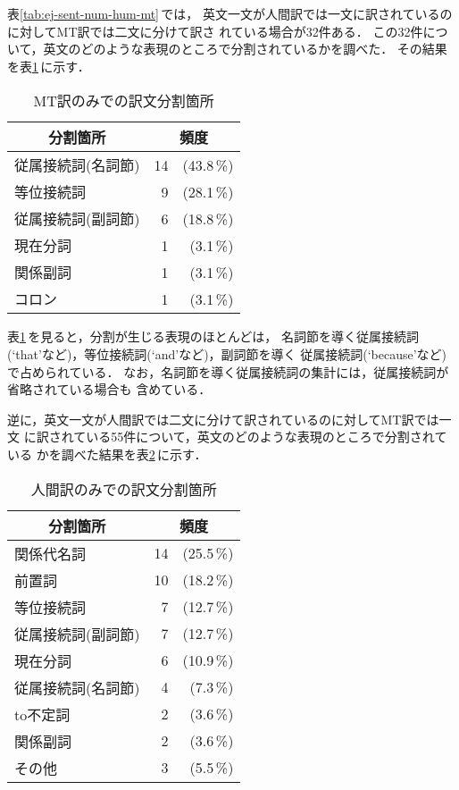 表\ref{tab:ej-sent-num-hum-mt}\,では，
英文一文が人間訳では一文に訳されているのに対してMT訳では二文に分けて訳さ
れている場合が32件ある．
この32件について，英文のどのような表現のところで分割されているかを調べた．
その結果を表\ref{tab:ej-sent-div-mt}\,に示す．
\begin{table}[htbp]
\caption{MT訳のみでの訳文分割箇所}
\label{tab:ej-sent-div-mt}
\begin{center}
\begin{tabular}{|l|r@{}r|}\hline
\multicolumn{1}{|c|}{分割箇所} & \multicolumn{2}{c|}{頻度} \\\hline\hline
従属接続詞(名詞節) & 14 & (43.8\,\%) \\
等位接続詞          &  9 & (28.1\,\%) \\
従属接続詞(副詞節) &  6 & (18.8\,\%) \\
現在分詞            &  1 & (3.1\,\%) \\
関係副詞            &  1 & (3.1\,\%) \\
コロン              &  1 & (3.1\,\%) \\\hline
\end{tabular}
\end{center}
\end{table}

表\ref{tab:ej-sent-div-mt}\,を見ると，分割が生じる表現のほとんどは，
名詞節を導く従属接続詞(`that'など)，等位接続詞(`and'など)，副詞節を導く
従属接続詞(`because'など)で占められている．
なお，名詞節を導く従属接続詞の集計には，従属接続詞が省略されている場合も
含めている．

逆に，英文一文が人間訳では二文に分けて訳されているのに対してMT訳では一文
に訳されている55件について，英文のどのような表現のところで分割されている
かを調べた結果を表\ref{tab:ej-sent-div-hum}\,に示す．
\begin{table}[htbp]
\caption{人間訳のみでの訳文分割箇所}
\label{tab:ej-sent-div-hum}
\begin{center}
\begin{tabular}{|l|r@{}r|}\hline
\multicolumn{1}{|c|}{分割箇所} & \multicolumn{2}{c|}{頻度} \\\hline\hline
関係代名詞          & 14 & (25.5\,\%) \\
前置詞              & 10 & (18.2\,\%) \\
等位接続詞          &  7 & (12.7\,\%) \\
従属接続詞(副詞節) &  7 & (12.7\,\%) \\
現在分詞            &  6 & (10.9\,\%) \\
従属接続詞(名詞節) &  4 & (7.3\,\%) \\
to不定詞            &  2 & (3.6\,\%) \\
関係副詞            &  2 & (3.6\,\%) \\
その他              &  3 & (5.5\,\%) \\\hline
\end{tabular}
\end{center}
\end{table}

